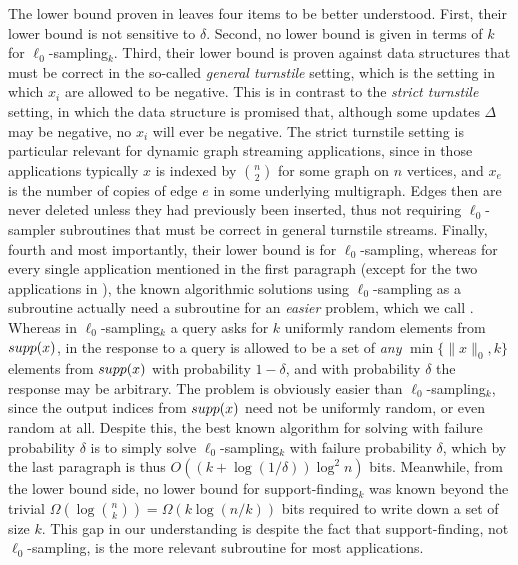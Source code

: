 The lower bound proven in \cite{JowhariST11} leaves four items to be better understood. First, their lower bound is not sensitive to $\delta$. Second, no lower bound is given in terms of $k$ for $\ell_0$-sampling$_k$. Third, their lower bound is proven against data structures that must be correct in the so-called {\em general turnstile} setting, which is the setting in which $x_i$ are allowed to be negative. This is in contrast to the {\em strict turnstile} setting, in which the data structure is promised that, although some updates $\Delta$ may be negative, no $x_i$ will ever be negative. The strict turnstile setting is particular relevant for dynamic graph streaming applications, since in those applications typically $x$ is indexed by $\binom{n}{2}$ for some graph on $n$ vertices, and $x_e$ is the number of copies of edge $e$ in some underlying multigraph. Edges then are never deleted unless they had previously been inserted, thus not requiring $\ell_0$-sampler subroutines that must be correct in general turnstile streams. Finally, fourth and most importantly, their lower bound is for $\ell_0$-sampling, whereas for every single application mentioned in the first paragraph (except for the two applications in \cite{FrahlingIS08}), the known algorithmic solutions using $\ell_0$-sampling as a subroutine actually need a subroutine for an {\em easier} problem, which we call {\em {}}. Whereas in $\ell_0$-sampling$_k$ a query asks for $k$ uniformly random elements from $\mathop{supp}(x)$, in  the response to a query is allowed to be a set of {\em any} $\min\{\|x\|_0, k\}$ elements from $\mathop{supp}(x)$ with probability $1-\delta$, and with probability $\delta$ the response may be arbitrary. The  problem is obviously easier than $\ell_0$-sampling$_k$, since the output indices from $\mathop{supp}(x)$ need not be uniformly random, or even random at all. Despite this, the best known algorithm for solving  with failure probability $\delta$ is to simply solve $\ell_0$-sampling$_k$ with failure probability $\delta$, which by the last paragraph is thus $O((k+\log(1/\delta))\log^2 n)$ bits. Meanwhile, from the lower bound side, no lower bound for support-finding$_k$ was known beyond the trivial $\Omega(\log\binom nk) = \Omega(k\log(n/k))$ bits required to write down a set of size $k$. This gap in our understanding is despite the fact that support-finding, not $\ell_0$-sampling, is the more relevant subroutine for most applications.


